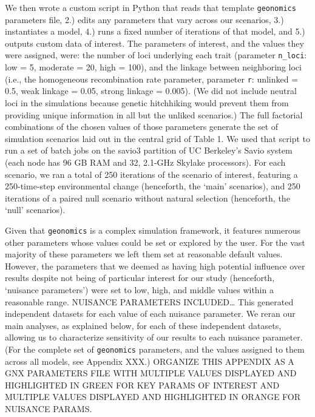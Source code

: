 \documentclass[9pt,twocolumn,twoside,lineno]{pnas-new}
\begin{document}
{We then wrote a custom script in Python that reads that template \texttt{geonomics}
parameters file, 2.) edits any parameters that vary 
across our scenarios, 3.) instantiates a model, 4.) runs a fixed number of iterations 
of that model, and 5.) outputs custom data of interest. The parameters of interest, 
and the values they were assigned, were: the number of loci underlying each trait 
(parameter \texttt{n\_loci}: low = 5, moderate = 20, high = 100), and the linkage between 
neighboring loci (i.e., the homogeneous recombination rate parameter, parameter \texttt{r}: unlinked = 
0.5, weak linkage = 0.05, strong linkage = 0.005).
(We did not include neutral loci in the simulations because genetic
hitchhiking would prevent them from providing unique information
in all but the unliked scenarios.)
The full factorial combinations
of the chosen values of those parameters generate the set
of simulation scenarios laid out in
the central grid of Table 1. We used that script to run a set of batch jobs on the 
savio3 partition of UC Berkeley’s Savio system (each node has 96 GB RAM and 32, 
2.1-GHz Skylake processors). For each scenario, we ran a total of 250 iterations of 
the scenario of interest, featuring a 250-time-step environmental change (henceforth, 
the ‘main’ scenarios), and 250 iterations of a paired null scenario without natural 
selection (henceforth, the ‘null’ scenarios). 


Given that \texttt{geonomics} is a complex simulation framework, it features numerous other 
parameters whose values could be set or explored by the user. For the vast majority of
these parameters we left them set at reasonable default values. However, the 
parameters that we deemed as having high potential influence over results despite not 
being of particular interest for our study (henceforth, ‘nuisance parameters’) were 
set to low, high, and middle values within a reasonable range. NUISANCE PARAMETERS 
INCLUDED… This generated independent datasets for each value of each nuisance 
parameter. We reran our main analyses, as explained below, for each of these 
independent datasets, allowing us to characterize sensitivity of our results to each 
nuisance parameter. (For the complete set of \texttt{geonomics} parameters, and the values 
assigned to them across all models, see Appendix XXX.) ORGANIZE THIS APPENDIX AS A GNX
PARAMETERS FILE WITH MULTIPLE VALUES DISPLAYED AND HIGHLIGHTED IN GREEN FOR KEY PARAMS
OF INTEREST AND MULTIPLE VALUES DISPLAYED AND HIGHLIGHTED IN ORANGE FOR NUISANCE PARAMS.


}
\end{document}
